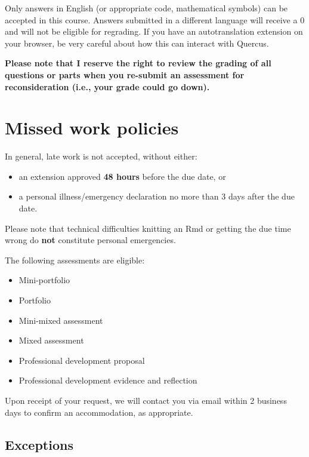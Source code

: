 \documentclass[
  openany]{book}
\begin{document}
Only answers in English (or appropriate code, mathematical symbols) can be accepted in this course. Answers submitted in a different language will receive a 0 and will not be eligible for regrading. If you have an autotranslation extension on your browser, be very careful about how this can interact with Quercus.

\textbf{Please note that I reserve the right to review the grading of all questions or parts when you re-submit an assessment for reconsideration (i.e., your grade could go down).}

\hypertarget{missed-work-policies}{%
\section{Missed work policies}\label{missed-work-policies}}

In general, late work is not accepted, without either:

\begin{itemize}
\item
  an extension approved \textbf{48 hours} before the due date, or
\item
  a personal illness/emergency declaration no more than 3 days after the due date.
\end{itemize}

Please note that technical difficulties knitting an Rmd or getting the due time wrong do \textbf{not} constitute personal emergencies.

The following assessments are eligible:

\begin{itemize}
\item
  Mini-portfolio
\item
  Portfolio
\item
  Mini-mixed assessment
\item
  Mixed assessment
\item
  Professional development proposal
\item
  Professional development evidence and reflection
\end{itemize}

Upon receipt of your request, we will contact you via email within 2 business days to confirm an accommodation, as appropriate.

\hypertarget{exceptions}{%
\subsection{Exceptions}\label{exceptions}}
\end{document}
